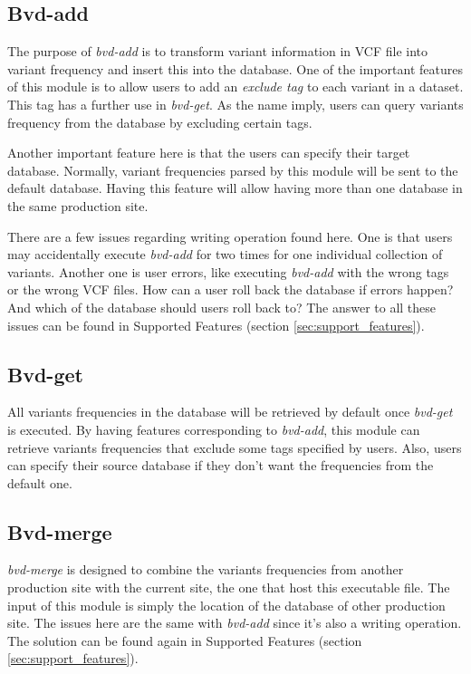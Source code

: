 \documentclass[a4paper,11pt]{kth-mag}
\begin{document}
\subsection{Bvd-add}
The purpose of \emph{bvd-add} is to transform variant information in VCF file into variant frequency and insert this into the database. One of the important features of this module is to allow users to add an \emph{exclude tag} to each variant in a dataset. This tag has a further use in \emph{bvd-get}. As the name imply, users can query variants frequency from the database by excluding certain tags. 

Another important feature here is that the users can specify their target database. Normally, variant frequencies parsed by this module will be sent to the default database. Having this feature will allow having more than one database in the same production site.

There are a few issues regarding writing operation found here. One is that users may accidentally execute \emph{bvd-add} for two times for one individual collection of variants. Another one is user errors, like executing \emph{bvd-add} with the wrong tags or the wrong VCF files. How can a user roll back the database if errors happen? And which of the database should users roll back to? The answer to all these issues can be found in Supported Features (section \ref{sec:support_features}).

\subsection{Bvd-get}
All variants frequencies in the database will be retrieved by default once \emph{bvd-get} is executed. By having features corresponding to \emph{bvd-add}, this module can retrieve variants frequencies that exclude some tags specified by users. Also, users can specify their source database if they don't want the frequencies from the default one.

\subsection{Bvd-merge} 
\emph{bvd-merge} is designed to combine the variants frequencies from another production site with the current site, the one that host this executable file. The input of this module is simply the location of the database of other production site. The issues here are the same with \emph{bvd-add} since it's also a writing operation. The solution can be found again in Supported Features (section \ref{sec:support_features}).
\end{document}
